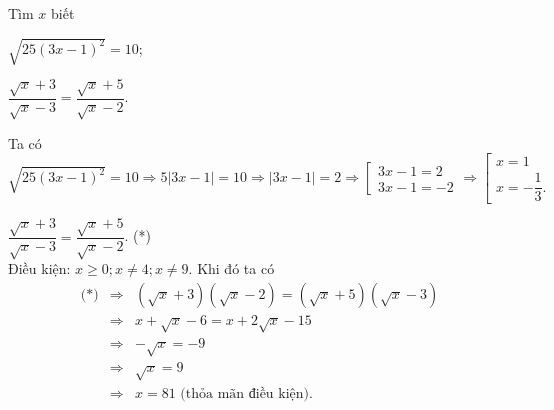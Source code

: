 \begin{bt}%
	Tìm $x$ biết 
	\begin{listEX}[2]
	\item $\sqrt{25(3x - 1)^2}=10$;
	\item $\dfrac{\sqrt{x} + 3}{\sqrt{x} - 3}=\dfrac{\sqrt{x} + 5}{\sqrt{x} - 2}$.
	\end{listEX}
	\loigiai
	{
	\begin{listEX}
	\item Ta có $\sqrt{25(3x - 1)^2}=10\Rightarrow 5|3x - 1|=10\Rightarrow |3x - 1|=2\Rightarrow \left[\begin{array}
	{l}{3x - 1=2}\\
	{3x - 1= - 2}
	\end{array}\right.\Rightarrow \left[\begin{array}
	{l}{x=1}\\
	{x= - \dfrac{1}{3}.}
	\end{array}\right.$
	\item $\dfrac{\sqrt{x}+3}{\sqrt{x}-3}=\dfrac{\sqrt{x}+5}{\sqrt{x}-2}$. \quad(*)\\
	Điều kiện: $x\geq 0 ; x\neq 4 ; x\neq 9$. Khi đó ta có
	\allowdisplaybreaks 
	\begin{eqnarray*}
	\text{(*)}&\Rightarrow & \left(\sqrt{x}+3\right)\left(\sqrt{x}-2\right)=\left(\sqrt{x}+5\right)\left(\sqrt{x}-3\right)\\
	&\Rightarrow & x+\sqrt{x}-6=x+2 \sqrt{x}-15\\
	&\Rightarrow & -\sqrt{x}=-9\\
	&\Rightarrow & \sqrt{x} = 9\\
	&\Rightarrow & x = 81 \text{ (thỏa mãn điều kiện).}
	\end{eqnarray*}
	\end{listEX}
	}
\end{bt}
